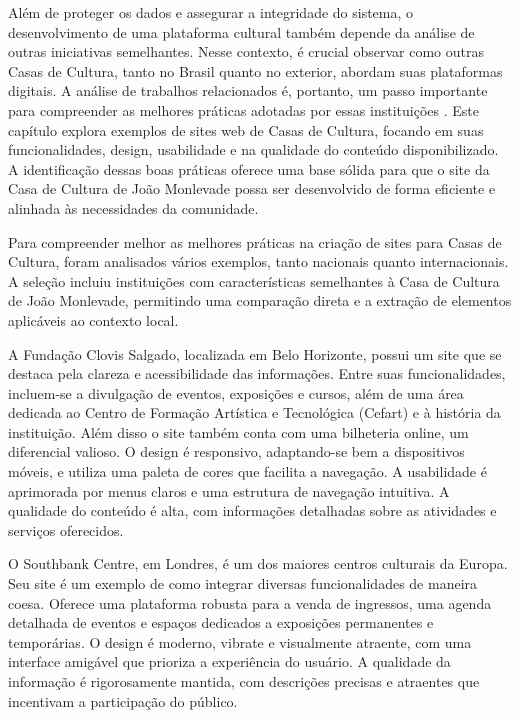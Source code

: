 Além de proteger os dados e assegurar a integridade do sistema, o desenvolvimento de uma plataforma cultural também depende da análise de outras iniciativas semelhantes. Nesse contexto, é crucial observar como outras Casas de Cultura, tanto no Brasil quanto no exterior, abordam suas plataformas digitais. A análise de trabalhos relacionados é, portanto, um passo importante para compreender as melhores práticas adotadas por essas instituições \cite{boud2003learning}. Este capítulo explora exemplos de sites web de Casas de Cultura, focando em suas funcionalidades, design, usabilidade e na qualidade do conteúdo disponibilizado. A identificação dessas boas práticas oferece uma base sólida para que o site da Casa de Cultura de João Monlevade possa ser desenvolvido de forma eficiente e alinhada às necessidades da comunidade.

Para compreender melhor as melhores práticas na criação de sites para Casas de Cultura, foram analisados vários exemplos, tanto nacionais quanto internacionais. A seleção incluiu instituições com características semelhantes à Casa de Cultura de João Monlevade, permitindo uma comparação direta e a extração de elementos aplicáveis ao contexto local.

A Fundação Clovis Salgado, localizada em Belo Horizonte, possui um site que se destaca pela clareza e acessibilidade das informações. Entre suas funcionalidades, incluem-se a divulgação de eventos, exposições e cursos, além de uma área dedicada ao Centro de Formação Artística e Tecnológica (Cefart) e à história da instituição. Além disso o site também conta com uma bilheteria online, um diferencial valioso. O design é responsivo, adaptando-se bem a dispositivos móveis, e utiliza uma paleta de cores que facilita a navegação. A usabilidade é aprimorada por menus claros e uma estrutura de navegação intuitiva. A qualidade do conteúdo é alta, com informações detalhadas sobre as atividades e serviços oferecidos.

O Southbank Centre, em Londres, é um dos maiores centros culturais da Europa. Seu site é um exemplo de como integrar diversas funcionalidades de maneira coesa. Oferece uma plataforma robusta para a venda de ingressos, uma agenda detalhada de eventos e espaços dedicados a exposições permanentes e temporárias. O design é moderno, vibrate e visualmente atraente, com uma interface amigável que prioriza a experiência do usuário. A qualidade da informação é rigorosamente mantida, com descrições precisas e atraentes que incentivam a participação do público.

